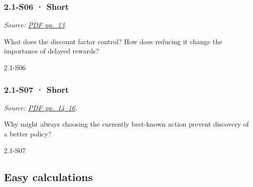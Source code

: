 \noindent\begin{minipage}{\linewidth}

\subsubsection{2.1-S06 · Short}\label{s06-short-3}

\emph{Source:
\href{../Lecture\%20Slides/2.1.\%20Introduction\%20to\%20Reinforcement\%20Learning.pdf\#page=13}{PDF
pp.~13}.}

What does the discount factor control? How does reducing it change the
importance of delayed rewards?

\begin{solution}[20mm]{2.1-S06}

\end{solution}
\end{minipage}\par\medskip

\noindent\begin{minipage}{\linewidth}

\subsubsection{2.1-S07 · Short}\label{s07-short-3}

\emph{Source:
\href{../Lecture\%20Slides/2.1.\%20Introduction\%20to\%20Reinforcement\%20Learning.pdf\#page=14}{PDF
pp.~14--16}.}

Why might always choosing the currently best-known action prevent
discovery of a better policy?

\begin{solution}[20mm]{2.1-S07}

\end{solution}
\end{minipage}\par\medskip

\subsection{Easy calculations}\label{easy-calculations-3}

